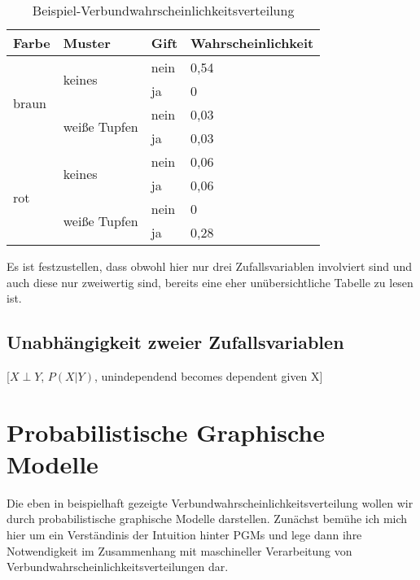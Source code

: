 \documentclass{llncs}
\begin{document}
\begin{table}[htb]
\caption{\label{tab:bspverbwhrv}Beispiel-Verbundwahrscheinlichkeitsverteilung}
\centering
\begin{tabular}{l|l|l|l}
  Farbe & Muster & Gift & Wahrscheinlichkeit \\ \hline
  \multirow{4}{*}{braun} & \multirow{2}{*}{keines}       & nein & 0,54 \\
                         &                               & ja   & 0    \\
                         & \multirow{2}{*}{weiße Tupfen} & nein & 0,03 \\
                         &                               & ja   & 0,03 \\ \hline
  \multirow{4}{*}{rot}   & \multirow{2}{*}{keines}       & nein & 0,06 \\
                         &                               & ja   & 0,06 \\
                         & \multirow{2}{*}{weiße Tupfen} & nein & 0    \\
                         &                               & ja   & 0,28 \\
\end{tabular}
\end{table}

Es ist festzustellen, dass obwohl hier nur drei Zufallsvariablen involviert sind und auch diese nur zweiwertig sind, bereits eine eher unübersichtliche Tabelle zu lesen ist. 

\subsection{Unabhängigkeit zweier Zufallsvariablen}

[$X \perp Y$, $ P(X|Y)$, unindependend becomes dependent given X]


\section{Probabilistische Graphische Modelle}

Die eben in  beispielhaft gezeigte Verbundwahrscheinlichkeitsverteilung wollen wir durch probabilistische graphische Modelle darstellen. Zunächst bemühe ich mich hier um ein Verständinis der Intuition hinter PGMs und lege dann ihre Notwendigkeit im Zusammenhang mit maschineller Verarbeitung von Verbundwahrscheinlichkeitsverteilungen dar. 
\end{document}
